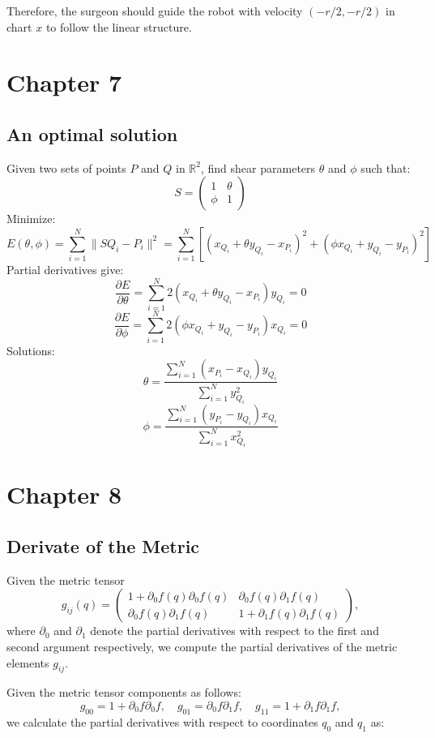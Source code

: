 \documentclass{article}
\begin{document}
Therefore, the surgeon should guide the robot with velocity $(-r/2, -r/2)$ in chart $x$ to follow the linear structure.

\newpage
\section{Chapter 7}
\subsection{An optimal solution}

Given two sets of points \( P \) and \( Q \) in \( \mathbb{R}^2 \), find shear parameters \( \theta \) and \( \phi \) such that:
\[
S = \begin{pmatrix} 1 & \theta \\ \phi & 1 \end{pmatrix}
\]
Minimize:
\[
E(\theta, \phi) = \sum_{i=1}^N \|SQ_i - P_i\|^2 = \sum_{i=1}^N \left[ (x_{Q_i} + \theta y_{Q_i} - x_{P_i})^2 + (\phi x_{Q_i} + y_{Q_i} - y_{P_i})^2 \right]
\]
Partial derivatives give:
\[
\frac{\partial E}{\partial \theta} = \sum_{i=1}^N 2(x_{Q_i} + \theta y_{Q_i} - x_{P_i})y_{Q_i} = 0
\]
\[
\frac{\partial E}{\partial \phi} = \sum_{i=1}^N 2(\phi x_{Q_i} + y_{Q_i} - y_{P_i})x_{Q_i} = 0
\]
Solutions:
\[
\theta = \frac{\sum_{i=1}^N (x_{P_i} - x_{Q_i})y_{Q_i}}{\sum_{i=1}^N y_{Q_i}^2}
\]
\[
\phi = \frac{\sum_{i=1}^N (y_{P_i} - y_{Q_i})x_{Q_i}}{\sum_{i=1}^N x_{Q_i}^2}
\]

\newpage
\section{Chapter 8}

\subsection{Derivate of the Metric}
Given the metric tensor
\[
g_{ij}(q) = \begin{pmatrix}
1 + \partial_0 f(q) \partial_0 f(q) & \partial_0 f(q) \partial_1 f(q) \\
\partial_0 f(q) \partial_1 f(q) & 1 + \partial_1 f(q) \partial_1 f(q)
\end{pmatrix},
\]
where \( \partial_0 \) and \( \partial_1 \) denote the partial derivatives with respect to the first and second argument respectively, we compute the partial derivatives of the metric elements \( g_{ij} \).


Given the metric tensor components as follows:
\[
g_{00} = 1 + \partial_0 f \partial_0 f, \quad g_{01} = \partial_0 f \partial_1 f, \quad g_{11} = 1 + \partial_1 f \partial_1 f,
\]
we calculate the partial derivatives with respect to coordinates \( q_0 \) and \( q_1 \) as:
\end{document}
